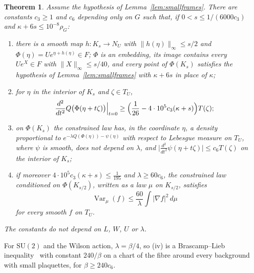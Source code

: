 \documentclass[11pt]{amsart}
\newtheorem{theorem}{Theorem}[section]
\theoremstyle{definition}
\theoremstyle{remark}
\numberwithin{equation}{section}
\newcommand{\SU}{\mathrm{SU}}
\begin{document}
\begin{theorem}\label{thm:fibrechart}
Assume the hypothesis of Lemma~\ref{lem:smallframes}. There are constants
$c_3\ge1$ and $c_6$ depending only on $G$ such that, if $0<s\le1/(6000c_3)$
and $\kappa+6s\le10^{-8}\rho_G$:
\begin{enumerate}[label=\textup{(\roman*)},leftmargin=*]
\item there is a smooth map $h:K_s\to N_U$ with $\lVert h(\eta)
\rVert_\infty\le s/2$ and $\Phi(\eta)=Ue^{\eta+h(\eta)}\in F$; $\Phi$ is an
embedding, its image contains every $Ue^X\in F$ with $\lVert X\rVert_\infty
\le s/40$, and every point of $\Phi(K_s)$ satisfies the hypothesis of
Lemma~\ref{lem:smallframes} with $\kappa+6s$ in place of $\kappa$;
\item for $\eta$ in the interior of $K_s$ and $\zeta\in T_U$,
\[
\frac{d^2}{dt^2}Q\bigl(\Phi(\eta+t\zeta)\bigr)\Big|_{t=0}\ge\Bigl(\frac1{26}-
4\cdot10^5c_3(\kappa+s)\Bigr)T(\zeta);
\]
\item on $\Phi(K_s)$ the constrained law has, in the coordinate $\eta$, a
density proportional to $e^{-\lambda Q(\Phi(\eta))-\psi(\eta)}$ with respect to
Lebesgue measure on $T_U$, where $\psi$ is smooth, does not depend on
$\lambda$, and $\lvert\frac{d^2}{dt^2}\psi(\eta+t\zeta)\rvert\le c_6
T(\zeta)$ on the interior of $K_s$;
\item if moreover $4\cdot10^5c_3(\kappa+s)\le\frac1{195}$ and $\lambda\ge60
c_6$, the constrained law conditioned on $\Phi(K_{s/2})$, written as a law
$\mu$ on $K_{s/2}$, satisfies
\[
\operatorname{Var}_\mu(f)\le\frac{60}\lambda\int\lvert\nabla f\rvert^2\,d\mu
\]
for every smooth $f$ on $T_U$.
\end{enumerate}
The constants do not depend on $L$, $W$, $U$ or $\lambda$.
\end{theorem}

For $\SU(2)$ and the Wilson action, $\lambda=\beta/4$, so (iv) is a
Brascamp--Lieb inequality~\cite{BL76} with constant $240/\beta$ on a chart of the fibre
around every background with small plaquettes, for $\beta\ge240c_6$.
\end{document}
